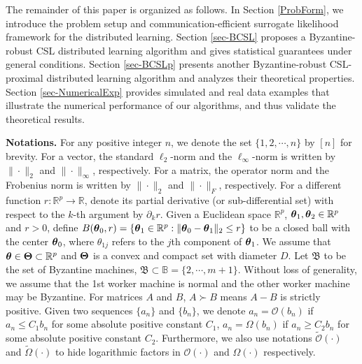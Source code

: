 \documentclass[12pt,a4paper]{article}%
\newcommand \vc[1]{{\mbox{\boldmath${#1}$}}}
\newcommand \vtheta{\vc \theta}
\numberwithin{equation}{section}
\begin{document}
The remainder of this paper is organized as follows. In Section \ref{ProbForm}, we introduce the problem setup and communication-efficient surrogate likelihood framework for the distributed learning. Section \ref{sec-BCSL} proposes a Byzantine-robust CSL distributed learning algorithm and gives statistical guarantees under general conditions. Section \ref{sec-BCSLp} presents another Byzantine-robust CSL-proximal distributed learning algorithm and analyzes their theoretical properties. Section \ref{sec-NumericalExp} provides simulated and real data examples that illustrate the numerical performance of our algorithms, and thus validate the theoretical results.

{\bf Notations.}
For any positive integer $n$, we denote the set $\{1,2,\cdots,n\}$ by $[n]$ for brevity. For a vector, the standard $\ell_2$-norm and the $\ell_\infty$-norm is written by $\|\cdot\|_2$ and $\|\cdot\|_\infty$, respectively. For a matrix, the operator norm and the Frobenius norm is written by $\|\cdot\|_2$ and $\|\cdot\|_F$, respectively. For a different function $r: \mathbb{R}^p\rightarrow\mathbb{R}$, denote its partial derivative (or sub-differential set) with respect to the $k$-th argument by $\partial_kr$. Given a Euclidean space $\mathbb{R}^p$, $\vtheta_1,\vtheta_2\in \mathbb{R}^p$ and $r>0$, define $B(\vtheta_0,r)=\{\vtheta_1\in \mathbb{R}^p: \|\vtheta_0-\vtheta_1\|_2\leq r\}$ to be a closed ball with the center $\vtheta_0$, where $\theta_{1j}$ refers to the $j$th component of $\vtheta_{1}$. We assume that $\vtheta\in \vc\Theta\subset\mathbb{R}^p$ and $\vc\Theta$ is a convex and compact set  with diameter $D$. Let $\mathfrak{B}$ to be the set of Byzantine machines,  $\mathfrak{B}\subset\mathds{B}=\{2,\cdots,m+1\}$. Without loss of generality, we  assume that the 1st worker machine is normal and the other worker machine may be Byzantine. For matrices $A$ and $B$,  $A\succ B$ means $A-B$ is strictly positive. Given two sequences $\{a_n\}$ and $\{b_n\}$, we denote $a_n=\mathcal{O}(b_n)$ if $a_n\leq C_1b_n$ for some absolute positive constant $C_1$, $a_n=\Omega(b_n)$ if $a_n\geq C_2b_n$ for some absolute positive constant $C_2$. Furthermore, we also use notations  $\mathcal{\tilde{O}}(\cdot)$ and $\tilde{\Omega}(\cdot)$ to  hide  logarithmic factors in $\mathcal{O}(\cdot)$ and $\Omega(\cdot)$ respectively.
\end{document}
